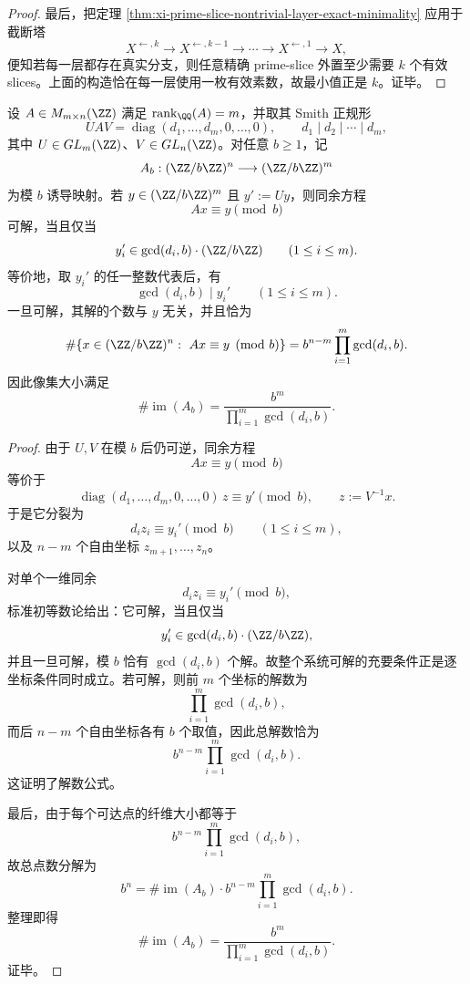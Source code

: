 \begin{proof}
最后，把定理 \ref{thm:xi-prime-slice-nontrivial-layer-exact-minimality} 应用于截断塔
\[
X^{\leftarrow,k}\to X^{\leftarrow,k-1}\to \cdots \to X^{\leftarrow,1}\to X,
\]
便知若每一层都存在真实分支，则任意精确 prime-slice 外置至少需要 \(k\) 个有效 slices。上面的构造恰在每一层使用一枚有效素数，故最小值正是 \(k\)。证毕。
\end{proof}

\begin{theorem}\label{thm:xi-time-part53ac-smith-linear-solvability-constant-fibers}
设 \(A\in M_{m\times n}(\ZZ)\) 满足 \(\operatorname{rank}_{\QQ}(A)=m\)，并取其 Smith 正规形
\[
UAV=\operatorname{diag}(d_1,\dots,d_m,0,\dots,0),
\qquad
d_1\mid d_2\mid \cdots \mid d_m,
\]
其中 \(U\in GL_m(\ZZ)\)、\(V\in GL_n(\ZZ)\)。对任意 \(b\ge 1\)，记
\[
A_b:(\ZZ/b\ZZ)^n\longrightarrow (\ZZ/b\ZZ)^m
\]
为模 \(b\) 诱导映射。若 \(y\in(\ZZ/b\ZZ)^m\) 且 \(y':=Uy\)，则同余方程
\[
Ax\equiv y\pmod b
\]
可解，当且仅当
\[
y_i'\in \gcd(d_i,b)\cdot (\ZZ/b\ZZ)
\qquad (1\le i\le m).
\]
等价地，取 \(y_i'\) 的任一整数代表后，有
\[
\gcd(d_i,b)\mid y_i'
\qquad (1\le i\le m).
\]
一旦可解，其解的个数与 \(y\) 无关，并且恰为
\[
\#\{x\in(\ZZ/b\ZZ)^n:\ Ax\equiv y\pmod b\}
=
b^{n-m}\prod_{i=1}^{m}\gcd(d_i,b).
\]
因此像集大小满足
\[
\#\operatorname{im}(A_b)
=
\frac{b^m}{\prod_{i=1}^{m}\gcd(d_i,b)}.
\]
\end{theorem}
\begin{proof}
由于 \(U,V\) 在模 \(b\) 后仍可逆，同余方程
\[
Ax\equiv y\pmod b
\]
等价于
\[
\operatorname{diag}(d_1,\dots,d_m,0,\dots,0)\,z\equiv y'\pmod b,
\qquad
z:=V^{-1}x.
\]
于是它分裂为
\[
d_i z_i\equiv y_i'\pmod b
\qquad (1\le i\le m),
\]
以及 \(n-m\) 个自由坐标 \(z_{m+1},\dots,z_n\)。

对单个一维同余
\[
d_i z_i\equiv y_i'\pmod b,
\]
标准初等数论给出：它可解，当且仅当
\[
y_i'\in \gcd(d_i,b)\cdot (\ZZ/b\ZZ),
\]
并且一旦可解，模 \(b\) 恰有 \(\gcd(d_i,b)\) 个解。故整个系统可解的充要条件正是逐坐标条件同时成立。若可解，则前 \(m\) 个坐标的解数为
\[
\prod_{i=1}^{m}\gcd(d_i,b),
\]
而后 \(n-m\) 个自由坐标各有 \(b\) 个取值，因此总解数恰为
\[
b^{n-m}\prod_{i=1}^{m}\gcd(d_i,b).
\]
这证明了解数公式。

最后，由于每个可达点的纤维大小都等于
\[
b^{n-m}\prod_{i=1}^{m}\gcd(d_i,b),
\]
故总点数分解为
\[
b^n
=
\#\operatorname{im}(A_b)\cdot
b^{n-m}\prod_{i=1}^{m}\gcd(d_i,b).
\]
整理即得
\[
\#\operatorname{im}(A_b)
=
\frac{b^m}{\prod_{i=1}^{m}\gcd(d_i,b)}.
\]
证毕。
\end{proof}

